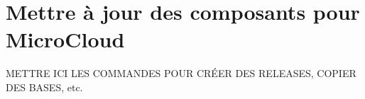 \chapter{Mettre à jour des composants pour MicroCloud}

METTRE ICI LES COMMANDES POUR CRÉER DES RELEASES, COPIER DES BASES, etc.
